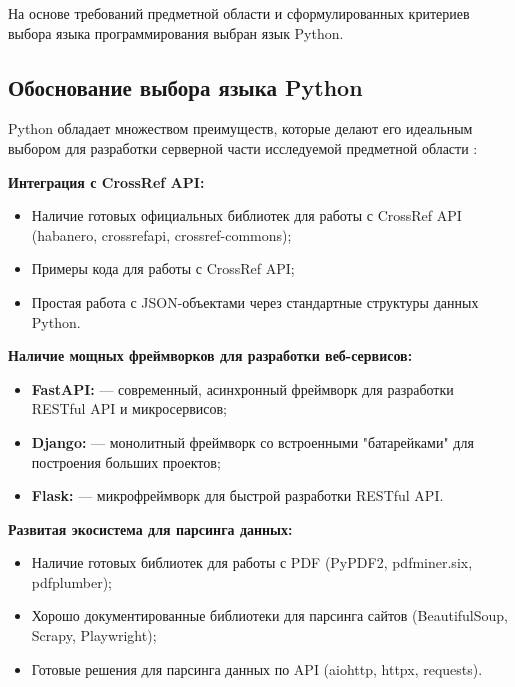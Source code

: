 На основе требований предметной области и сформулированных критериев выбора 
языка программирования выбран язык Python.

\subsection{Обоснование выбора языка Python}

Python обладает множеством преимуществ, которые делают его идеальным выбором для разработки серверной части исследуемой предметной области \cite{modern-python,solid-principles-article, indonesian}:

\begin{compactenum}
	\item \textbf{Интеграция с CrossRef API:}
	\begin{itemize}
		\item Наличие готовых официальных библиотек для работы с CrossRef API (habanero, crossrefapi, crossref-commons);
		\item Примеры кода для работы с CrossRef API;
		\item Простая работа с JSON-объектами через стандартные структуры данных Python.
	\end{itemize}

	\item \textbf{Наличие мощных фреймворков для разработки веб-сервисов:}
		\begin{itemize}
			\item \textbf{FastAPI:} --- современный, асинхронный фреймворк для разработки RESTful API и микросервисов;
			\item \textbf{Django:} --- монолитный фреймворк со встроенными "батарейками" для построения больших проектов;
			\item \textbf{Flask:} --- микрофреймворк для быстрой разработки RESTful API.
		\end{itemize}

	\item \textbf{Развитая экосистема для парсинга данных:}
	    \begin{itemize}
			\item Наличие готовых библиотек для работы с PDF (PyPDF2, pdfminer.six, pdfplumber);
			\item Хорошо документированные библиотеки для парсинга сайтов (BeautifulSoup, Scrapy, Playwright);
			\item Готовые решения для парсинга данных по API (aiohttp, httpx, requests).
		\end{itemize}
	

\end{compactenum}
